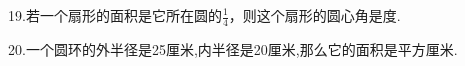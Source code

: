 19.若一个扇形的面积是它所在圆的$\frac{1}{4}$，则这个扇形的圆心角是\key{\qquad}度.



20.一个圆环的外半径是25厘米,内半径是20厘米,那么它的面积是\key{\qquad}平方厘米.



